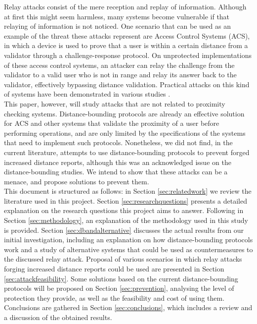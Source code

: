 \documentclass{article}
\begin{document}
Relay attacks consist of the mere reception and replay of information. Although at first this might seem harmless, many systems become vulnerable if that relaying of information is not noticed. One scenario that can be used as an example of the threat these attacks represent are Access Control Systems (ACS), in which a device is used to prove that a user is within a certain distance from a validator through a challenge-response protocol. On unprotected implementations of these access control systems, an attacker can relay the challenge from the validator to a valid user who is not in range and relay its answer back to the validator, effectively bypassing distance validation. Practical attacks on this kind of systems have been demonstrated in various studies \cite{francillon2011relay, francis2010practical, hancke2005practical, markantonakis2012practical}.\\

This paper, however, will study attacks that are not related to proximity checking systems. Distance-bounding protocols are already an effective solution for ACS and other systems that validate the proximity of a user before performing operations, and are only limited by the specifications of the systems that need to implement such protocols. Nonetheless, we did not find, in the current literature, attempts to use distance-bounding protocols to prevent forged increased distance reports, although this was an acknowledged issue on the distance-bounding studies. We intend to show that these attacks can be a menace, and propose solutions to prevent them.\\

This document is structured as follows: in Section \ref{sec:relatedwork} we review the literature used in this project. Section \ref{sec:researchquestions} presents a detailed explanation on the research questions this project aims to answer. Following in Section \ref{sec:methodology}, an explanation of the methodology used in this study is provided. Section \ref{sec:dbandalternative} discusses the actual results from our initial investigation, including an explanation on how distance-bounding protocols work and a study of alternative systems that could be used as countermeasures to the discussed relay attack. Proposal of various scenarios in which relay attacks forging increased distance reports could be used are presented in Section \ref{sec:attackfeasibility}. Some solutions based on the current distance-bounding protocols will be proposed on Section \ref{sec:prevention}, analysing the level of protection they provide, as well as the feasibility and cost of using them. Conclusions are gathered in Section \ref{sec:conclusions}, which includes a review and a discussion of the obtained results.\\
\end{document}
